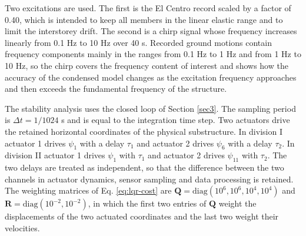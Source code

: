 \documentclass[11pt,a4paper]{article}
\numberwithin{equation}{section}
\begin{document}
Two excitations are used. The first is the El Centro record scaled by a factor of 0.40, which is intended to keep all members in the linear elastic range and to limit the interstorey drift. The second is a chirp signal whose frequency increases linearly from 0.1 Hz to 10 Hz over 40 s. Recorded ground motions contain frequency components mainly in the ranges from 0.1 Hz to 1 Hz and from 1 Hz to 10 Hz, so the chirp covers the frequency content of interest and shows how the accuracy of the condensed model changes as the excitation frequency approaches and then exceeds the fundamental frequency of the structure.

The stability analysis uses the closed loop of Section \ref{sec3}. The sampling period is \(\Delta t=1/1024\) s and is equal to the integration time step. Two actuators drive the retained horizontal coordinates of the physical substructure. In division I actuator 1 drives \(\psi_{1}\) with a delay \(\tau_{1}\) and actuator 2 drives \(\psi_{6}\) with a delay \(\tau_{2}\). In division II actuator 1 drives \(\psi_{1}\) with \(\tau_{1}\) and actuator 2 drives \(\psi_{11}\) with \(\tau_{2}\). The two delays are treated as independent, so that the difference between the two channels in actuator dynamics, sensor sampling and data processing is retained. The weighting matrices of Eq. \eqref{eq:lqr-cost} are \(\mathbf{Q}=\mathrm{diag}(10^{6},10^{6},10^{4},10^{4})\) and \(\mathbf{R}=\mathrm{diag}(10^{-2},10^{-2})\), in which the first two entries of \(\mathbf{Q}\) weight the displacements of the two actuated coordinates and the last two weight their velocities.
\end{document}
